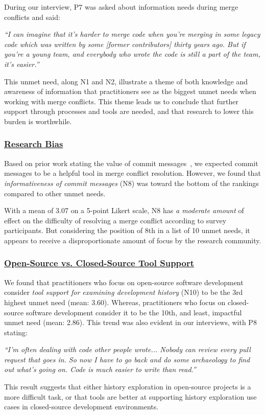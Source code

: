 During our interview, P7 was asked about information needs during merge conflicts and said:
\begin{displayquote}
\textit{``I can imagine that it's harder to merge code when you're merging in some legacy code which was written by some [former contributors] thirty years ago. But if you're a young team, and everybody who wrote the code is still a part of the team, it's easier.''}
\end{displayquote}

This unmet need, along N1 and N2, illustrate a theme of both knowledge and awareness of information that practitioners see as the biggest unmet needs when working with merge conflicts.
This theme leads us to conclude that further support through processes and tools are needed, and that research to lower this burden is worthwhile.

\subsubsection{\underline{Research Bias}}
Based on prior work stating the value of commit messages~\cite{yamauchi2014clustering}\cite{hindle2009automatic}\cite{cortes2014automatically}\cite{hattori2008nature}, we expected commit messages to be a helpful tool in merge conflict resolution.
However, we found that \textit{informativeness of commit messages} (N8) was toward the bottom of the rankings compared to other unmet needs.

With a mean of 3.07 on a 5-point Likert scale, N8 has \textit{a moderate amount} of effect on the difficulty of resolving a merge conflict according to survey participants.
But considering the position of 8th in a list of 10 unmet needs, it appears to receive a disproportionate amount of focus by the research community.



\subsubsection{\underline{Open-Source vs. Closed-Source Tool Support}}
\label{oss_vs_closed_tool_support} 

We found that practitioners who focus on open-source software development consider \textit{tool support for examining development history} (N10) to be the 3rd highest unmet need (mean: 3.60).
Whereas, practitioners who focus on closed-source software development consider it to be the 10th, and least, impactful unmet need (mean: 2.86).
This trend was also evident in our interviews, with P8 stating:

\begin{displayquote}
\textit{``I'm often dealing with code other people wrote... Nobody can review every pull request that goes in. So now I have to go back and do some archaeology to find out what's going on. Code is much easier to write than read.''}
\end{displayquote}

This result suggests that either history exploration in open-source projects is a more difficult task, or that tools are better at supporting history exploration use cases in closed-source development environments.

